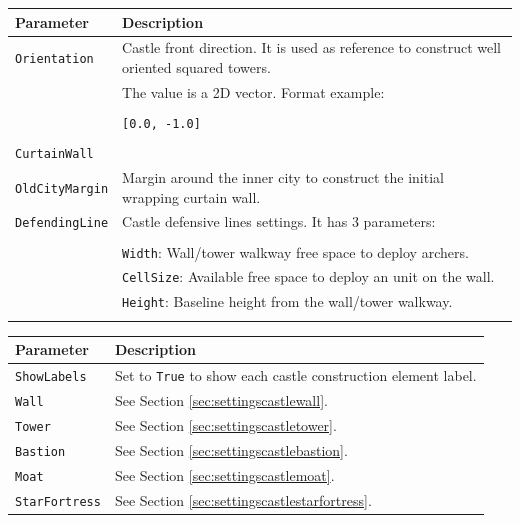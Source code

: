 \documentclass[tog]{acmsiggraph}
\begin{document}
\begin{tabularx}{0.48\textwidth}{ |l|X| }
\hline 
\textbf{Parameter} & \textbf{Description} \\[0.15cm]
 \hline
  \texttt{Orientation} & Castle front direction. It is used as reference to construct well oriented squared towers. \\
  & The value is a 2D vector. Format example:  \\ 
  & \\
  & \quad\texttt{[0.0, -1.0]}\\
  & \\
 \hline
 
 
 \texttt{CurtainWall} & \\
 \texttt{OldCityMargin} & Margin around the inner city to construct the initial wrapping curtain wall. \\
 \hline
 \texttt{DefendingLine} & Castle defensive lines settings. It has 3 parameters: \\
 & \\
 & \quad\texttt{Width}: Wall/tower walkway free space to deploy archers. \\
 & \quad\texttt{CellSize}: Available free space to deploy an unit on the wall. \\
 & \quad\texttt{Height}: Baseline height from the wall/tower walkway. \\
 & \\
 \hline
\end{tabularx} 


 \begin{tabularx}{0.48\textwidth}{ |l|X| }
\hline 
\textbf{Parameter} & \textbf{Description} \\[0.15cm]
 \hline
\texttt{ShowLabels} & Set to \texttt{True} to show each castle construction element label. \\
 \hline
 \texttt{Wall} & See Section \ref{sec:settingscastlewall}. \\
 \hline
 \texttt{Tower} & See Section \ref{sec:settingscastletower}. \\
 \hline
 \texttt{Bastion} & See Section \ref{sec:settingscastlebastion}. \\
 \hline 
 \texttt{Moat} & See Section \ref{sec:settingscastlemoat}. \\
 \hline
 \texttt{StarFortress} & See Section \ref{sec:settingscastlestarfortress}. \\
 \hline
\end{tabularx} 
\end{document}
